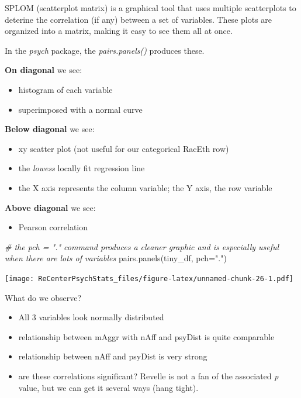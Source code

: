 \documentclass[
  english,
]{book}
\newenvironment{Shaded}{\begin{snugshade}}{\end{snugshade}}
\newcommand{\AttributeTok}[1]{\textcolor[rgb]{0.77,0.63,0.00}{#1}}
\newcommand{\CommentTok}[1]{\textcolor[rgb]{0.56,0.35,0.01}{\textit{#1}}}
\newcommand{\FunctionTok}[1]{\textcolor[rgb]{0.00,0.00,0.00}{#1}}
\newcommand{\NormalTok}[1]{#1}
\newcommand{\StringTok}[1]{\textcolor[rgb]{0.31,0.60,0.02}{#1}}
\providecommand{\tightlist}{%
  \setlength{\itemsep}{0pt}\setlength{\parskip}{0pt}}
\begin{document}
SPLOM (scatterplot matrix) is a graphical tool that uses multiple scatterplots to deterine the correlation (if any) between a set of variables. These plots are organized into a matrix, making it easy to see them all at once.

In the \emph{psych} package, the \emph{pairs.panels()} produces these.

\textbf{On diagonal} we see:

\begin{itemize}
\tightlist
\item
  histogram of each variable
\item
  superimposed with a normal curve
\end{itemize}

\textbf{Below diagonal} we see:

\begin{itemize}
\tightlist
\item
  xy scatter plot (not useful for our categorical RacEth row)
\item
  the \emph{lowess} locally fit regression line
\item
  the X axis represents the column variable; the Y axis, the row variable
\end{itemize}

\textbf{Above diagonal} we see:

\begin{itemize}
\tightlist
\item
  Pearson correlation
\end{itemize}

\begin{Shaded}
\begin{Highlighting}[]
\CommentTok{\# the pch = "." command produces a cleaner graphic and is especially useful when there are lots of variables}
\FunctionTok{pairs.panels}\NormalTok{(tiny\_df, }\AttributeTok{pch=}\StringTok{"."}\NormalTok{)}
\end{Highlighting}
\end{Shaded}

\texttt{[image: ReCenterPsychStats\_files/figure-latex/unnamed-chunk-26-1.pdf]}

What do we observe?

\begin{itemize}
\tightlist
\item
  All 3 variables look normally distributed
\item
  relationship between mAggr with nAff and psyDist is quite comparable
\item
  relationship between nAff and psyDist is very strong
\item
  are these correlations significant? Revelle \citeyearpar{revelle_introduction_2020} is not a fan of the associated \emph{p} value, but we can get it several ways (hang tight).
\end{itemize}
\end{document}
